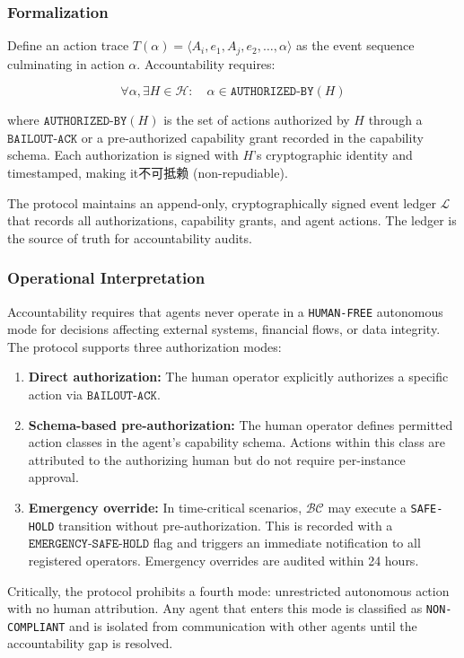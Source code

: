 \subsubsection{Formalization}
Define an action trace $T(\alpha) = \langle A_i, e_1, A_j, e_2, \ldots, \alpha \rangle$ as the event sequence culminating in action $\alpha$. Accountability requires:

\[
\forall \alpha, \exists H \in \mathcal{H}: \quad \alpha \in \texttt{AUTHORIZED-BY}(H)
\]

where $\texttt{AUTHORIZED-BY}(H)$ is the set of actions authorized by $H$ through a $\texttt{BAILOUT-ACK}$ or a pre-authorized capability grant recorded in the capability schema. Each authorization is signed with $H$'s cryptographic identity and timestamped, making it不可抵赖 (non-repudiable).

The protocol maintains an append-only, cryptographically signed event ledger $\mathcal{L}$ that records all authorizations, capability grants, and agent actions. The ledger is the source of truth for accountability audits.

\subsubsection{Operational Interpretation}
Accountability requires that agents never operate in a \texttt{HUMAN-FREE} autonomous mode for decisions affecting external systems, financial flows, or data integrity. The protocol supports three authorization modes:

\begin{enumerate}
    \item \textbf{Direct authorization:} The human operator explicitly authorizes a specific action via $\texttt{BAILOUT-ACK}$.
    \item \textbf{Schema-based pre-authorization:} The human operator defines permitted action classes in the agent's capability schema. Actions within this class are attributed to the authorizing human but do not require per-instance approval.
    \item \textbf{Emergency override:} In time-critical scenarios, $\mathcal{BC}$ may execute a \texttt{SAFE-HOLD} transition without pre-authorization. This is recorded with a $\texttt{EMERGENCY-SAFE-HOLD}$ flag and triggers an immediate notification to all registered operators. Emergency overrides are audited within 24 hours.
\end{enumerate}

Critically, the protocol prohibits a fourth mode: unrestricted autonomous action with no human attribution. Any agent that enters this mode is classified as \texttt{NON-COMPLIANT} and is isolated from communication with other agents until the accountability gap is resolved.

